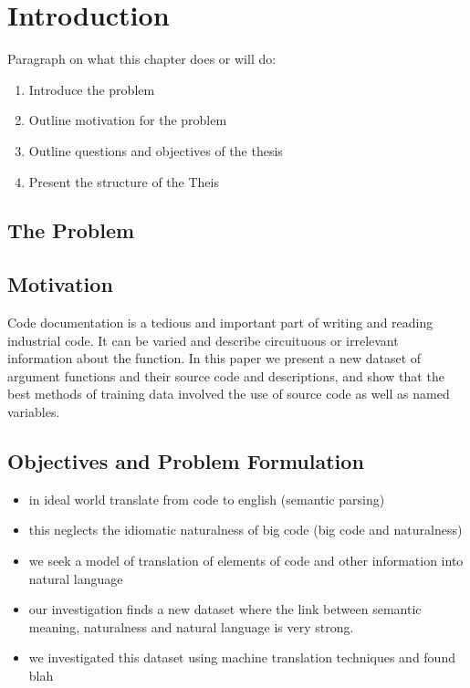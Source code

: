 \chapter{Introduction}
\label{chapterlabel1}


Paragraph on what this chapter does or will do:
\begin{enumerate}
    \item Introduce the problem
    \item Outline motivation for the problem 
    \item Outline questions and objectives of the thesis
    \item Present the structure of the Theis 
\end{enumerate}

\section{The Problem} %
\label{sec:the_problem}

\blindtext


\section{Motivation} %
\label{sec:motivation}


Code documentation is a tedious and important part of writing and reading industrial code. It can be varied and describe circuituous or irrelevant information about the function. In this paper we present a new dataset of argument functions and their source code and descriptions, and show that the best methods of training data involved the use of source code as well as named variables. 



\section{Objectives and Problem Formulation} %
\label{sec:problem_formulation}

\begin{itemize}
    \item in ideal world translate from code to english (semantic parsing)
    \item this neglects the idiomatic naturalness of big code (big code and naturalness)
    \item we seek a model of translation of elements of code and other information into natural language
    \item our investigation finds a new dataset where the link between semantic meaning, naturalness and natural language is very strong. 
    \item we investigated this dataset using machine translation techniques and found blah
\end{itemize}
 

